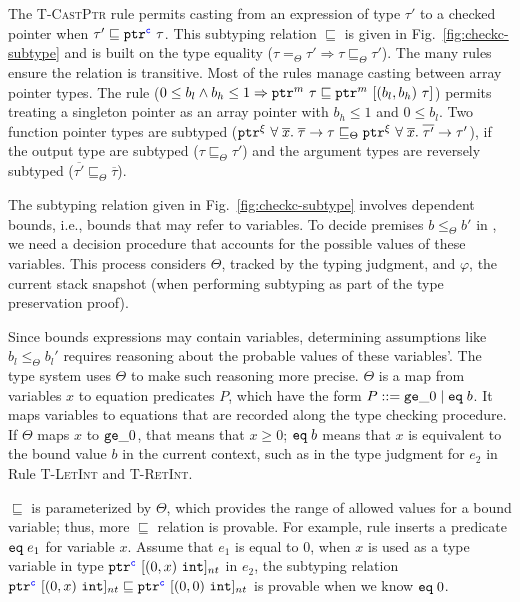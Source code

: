  The \textsc{T-CastPtr} rule
permits casting from an expression of type $\tau'$ to a checked pointer when
$\tau' \sqsubseteq \tptr{\tau}{\cmode}$. This subtyping relation
$\sqsubseteq$ is given in Fig.~\ref{fig:checkc-subtype} and is built on the type equality
($\tau =_{\Theta} \tau'\Rightarrow\tau \sqsubseteq_{\Theta} \tau'$). The many
rules ensure the relation is transitive. Most of the rules manage
casting between array pointer types. The rule 
($0\le b_l \wedge b_h \le 1 \Rightarrow \tptr{\tau}{m}\sqsubseteq
\tarrayptr{b_l}{b_h}{\tau}{m}$) permits treating a singleton
pointer as an array pointer with $b_h\le 1$ and $0 \le b_l$.
Two function pointer types are subtyped ($\tptr{\tfun{\overline{x}}{\overline{\tau}}{\tau}}{\xi} \sqsubseteq_{\Theta} \tptr{\tfun{\overline{x}}{\overline{\tau'}}{\tau'}}{\xi}$), 
if the output type are subtyped ($\tau\sqsubseteq_{\Theta}\tau'$) and the argument types are reversely subtyped ($\overline{\tau'}\sqsubseteq_{\Theta}\overline{\tau}$).


The subtyping relation given in Fig.~\ref{fig:checkc-subtype} involves
dependent bounds, i.e., bounds that may refer to variables. To decide
premises $b \leq_{\Theta} b'$ in , we need a decision procedure that accounts for
the possible values of these variables. This process considers
$\Theta$, tracked by the typing judgment, and $\varphi$, the current
stack snapshot (when performing subtyping as part of the type
preservation proof).

Since bounds expressions may
contain variables, determining assumptions like $b_l \leq_{\Theta} b_l'$
requires reasoning about the probable values of these variables'. The type
system uses $\Theta$ to make such reasoning more precise.
$\Theta$ is a map from variables $x$ to
equation predicates $P$, which have the form $P ::= \tgez \;|\; \teq{b}$.
It maps variables to equations that are recorded along the type checking procedure.
If $\Theta$ maps $x$ to $\tgez$, that means that $x \ge 0$;
$\teq{b}$ means that $x$ is equivalent to the bound value $b$ in the current context, 
such as in the type judgment for $e_2$ in Rule \textsc{T-LetInt} and \textsc{T-RetInt}.

$\sqsubseteq$ is parameterized by
$\Theta$, which provides the range of allowed values for a bound
variable; thus, more $\sqsubseteq$ relation is provable. For example,
rule  inserts a predicate $\teq{e_1}$ for variable $x$.
Assume that $e_1$ is equal to $0$,
when $x$ is used as a type variable in type $\tntarrayptr{0}{x}{\tint}{\cmode}$ in $e_2$,
the subtyping relation $\tntarrayptr{0}{x}{\tint}{\cmode} \sqsubseteq
\tntarrayptr{0}{0}{\tint}{\cmode}$ is provable when we know
$\teq{0}$.

